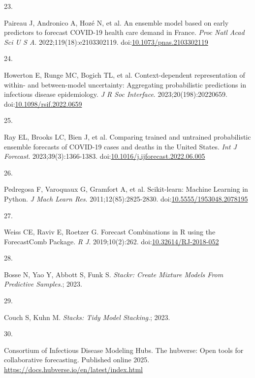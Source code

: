 \documentclass[
]{article}
\newlength{\cslhangindent}
\newlength{\csllabelwidth}
\newenvironment{CSLReferences}[2] %
 {\begin{list}{}{%
  \setlength{\itemindent}{0pt}
  \setlength{\leftmargin}{0pt}
  \setlength{\parsep}{0pt}
  \ifodd #1
   \setlength{\leftmargin}{\cslhangindent}
   \setlength{\itemindent}{-1\cslhangindent}
  \fi
  \setlength{\itemsep}{#2\baselineskip}}}
 {\end{list}}
\newcommand{\CSLLeftMargin}[1]{\parbox[t]{\csllabelwidth}{\strut#1\strut}}
\newcommand{\CSLRightInline}[1]{\parbox[t]{\linewidth - \csllabelwidth}{\strut#1\strut}}
\begin{document}
\begin{CSLReferences}{0}{1}
\CSLLeftMargin{23. }%
\CSLRightInline{Paireau J, Andronico A, Hozé N, et al. An ensemble model
based on early predictors to forecast {COVID}-19 health care demand in
{France}. \emph{Proc Natl Acad Sci U S A}. 2022;119(18):e2103302119.
doi:\href{https://doi.org/10.1073/pnas.2103302119}{10.1073/pnas.2103302119}}

\CSLLeftMargin{24. }%
\CSLRightInline{Howerton E, Runge MC, Bogich TL, et al.
Context-dependent representation of within- and between-model
uncertainty: Aggregating probabilistic predictions in infectious disease
epidemiology. \emph{J R Soc Interface}. 2023;20(198):20220659.
doi:\href{https://doi.org/10.1098/rsif.2022.0659}{10.1098/rsif.2022.0659}}

\CSLLeftMargin{25. }%
\CSLRightInline{Ray EL, Brooks LC, Bien J, et al. Comparing trained and
untrained probabilistic ensemble forecasts of {COVID}-19 cases and
deaths in the {United} {States}. \emph{Int J Forecast}.
2023;39(3):1366-1383.
doi:\href{https://doi.org/10.1016/j.ijforecast.2022.06.005}{10.1016/j.ijforecast.2022.06.005}}

\CSLLeftMargin{26. }%
\CSLRightInline{Pedregosa F, Varoquaux G, Gramfort A, et al.
Scikit-learn: {Machine} {Learning} in {Python}. \emph{J Mach Learn Res}.
2011;12(85):2825-2830.
doi:\href{https://doi.org/10.5555/1953048.2078195}{10.5555/1953048.2078195}}

\CSLLeftMargin{27. }%
\CSLRightInline{Weiss CE, Raviv E, Roetzer G. Forecast Combinations in R
using the ForecastComb Package. \emph{R J}. 2019;10(2):262.
doi:\href{https://doi.org/10.32614/RJ-2018-052}{10.32614/RJ-2018-052}}

\CSLLeftMargin{28. }%
\CSLRightInline{Bosse N, Yao Y, Abbott S, Funk S. \emph{Stackr: {Create}
{Mixture} {Models} {From} {Predictive} {Samples}}.; 2023.}

\CSLLeftMargin{29. }%
\CSLRightInline{Couch S, Kuhn M. \emph{Stacks: Tidy Model Stacking}.;
2023.}

\CSLLeftMargin{30. }%
\CSLRightInline{Consortium of Infectious Disease Modeling Hubs. The
hubverse: Open tools for collaborative forecasting. Published online
2025. \url{https://docs.hubverse.io/en/latest/index.html}}


\end{CSLReferences}
\end{document}

